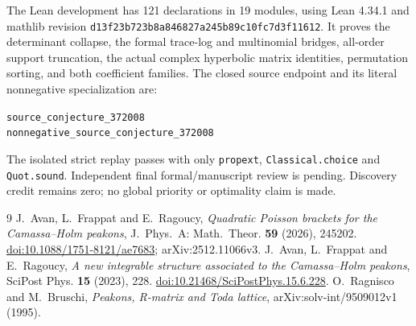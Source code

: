 \documentclass[11pt]{article}
\begin{document}
The Lean development has 121 declarations in 19 modules, using Lean 4.34.1 and mathlib revision\newline
\texttt{d13f23b723b8a846827a245b89c10fc7d3f11612}. It proves the determinant collapse, the formal trace-log and multinomial bridges, all-order support truncation, the actual complex hyperbolic matrix identities, permutation sorting, and both coefficient families. The closed source endpoint and its literal nonnegative specialization are:
\begin{center}\small\texttt{source\_conjecture\_372008}\\\texttt{nonnegative\_source\_conjecture\_372008}\end{center}
The isolated strict replay passes with only \texttt{propext}, \texttt{Classical.choice} and \texttt{Quot.sound}. Independent final formal/manuscript review is pending. Discovery credit remains zero; no global priority or optimality claim is made.

\small
\begin{thebibliography}{9}
 J.~Avan, L.~Frappat and E.~Ragoucy, \emph{Quadratic Poisson brackets for the Camassa--Holm peakons}, J.~Phys.~A: Math.~Theor. \textbf{59} (2026), 245202. \href{https://doi.org/10.1088/1751-8121/ae7683}{doi:10.1088/1751-8121/ae7683}; arXiv:2512.11066v3.
 J.~Avan, L.~Frappat and E.~Ragoucy, \emph{A new integrable structure associated to the Camassa--Holm peakons}, SciPost Phys. \textbf{15} (2023), 228. \href{https://doi.org/10.21468/SciPostPhys.15.6.228}{doi:10.21468/SciPostPhys.15.6.228}.
 O.~Ragnisco and M.~Bruschi, \emph{Peakons, R-matrix and Toda lattice}, arXiv:solv-int/9509012v1 (1995).
\end{thebibliography}
\end{document}
